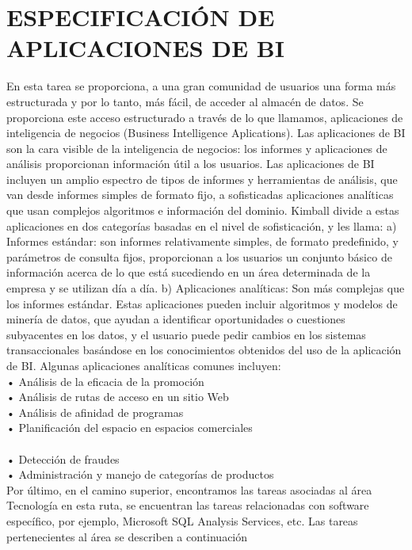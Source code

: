 \section{ESPECIFICACIÓN DE APLICACIONES DE BI}
\item{
En esta tarea se proporciona, a una gran comunidad de usuarios una forma más estructurada y por lo tanto, más fácil, de acceder al almacén de datos. Se proporciona este acceso estructurado a través de lo que llamamos, aplicaciones de inteligencia de negocios (Business Intelligence Aplications). Las aplicaciones de BI son la cara visible de la inteligencia de negocios: los informes y aplicaciones de análisis proporcionan información útil a los usuarios. Las aplicaciones de BI incluyen un amplio espectro de tipos de informes y herramientas de análisis, que van desde informes simples de formato fijo, a sofisticadas aplicaciones analíticas que usan complejos algoritmos e información del dominio. Kimball divide a estas aplicaciones en dos categorías basadas en el nivel de sofisticación, y les llama:
a)	Informes estándar: son informes relativamente simples, de formato predefinido, y parámetros de consulta fijos, proporcionan a los usuarios un conjunto básico de información acerca de lo que está sucediendo en un área determinada de la empresa y se utilizan día a día.
b)	Aplicaciones analíticas: Son más complejas que los informes estándar. Estas aplicaciones pueden incluir algoritmos y modelos de minería de datos, que ayudan a identificar oportunidades o cuestiones subyacentes en los datos, y el usuario puede pedir cambios en los sistemas transaccionales basándose en los conocimientos obtenidos del uso de la aplicación de BI. Algunas aplicaciones analíticas comunes incluyen:\\

•	Análisis de la eficacia de la promoción\\
•	Análisis de rutas de acceso en un sitio Web\\
•	Análisis de afinidad de programas\\
•	Planificación del espacio en espacios comerciales\\\\
•	Detección de fraudes\\
•	Administración y manejo de categorías de productos\\
Por último, en el camino superior, encontramos las tareas asociadas al área Tecnología en esta ruta, se encuentran las tareas relacionadas con software específico, por ejemplo, Microsoft SQL Analysis Services, etc. Las tareas pertenecientes al área se describen a continuación
}
